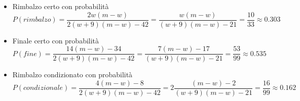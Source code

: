 \documentclass[a4paper,11pt]{article}
\begin{document}
\begin{itemize}
	\item 	
	Rimbalzo certo con probabilità
	 \[ P(rimbalzo)=\frac{2w(m-w)}{2(w+9)(m-w)-42}
	 =\frac{w(m-w)}{(w+9)(m-w)-21}
	 = \frac{10}{33}\approx0.303
	 \]

	\item 	
	Finale certo con probabilità 
	 \[ P(fine)=\frac{14(m-w)-34}{2(w+9)(m-w)-42}
	 =\frac{7(m-w)-17}{(w+9)(m-w)-21}
	 = \frac{53}{99}\approx0.535
	 \]
	 
	 \item 	
	 Rimbalzo condizionato con probabilità 
	 \[ P(condizionale)=\frac{4(m-w)-8}{2(w+9)(m-w)-42}
	 =2\frac{(m-w)-2}{(w+9)(m-w)-21}
	 = \frac{16}{99}\approx0.162
	 \]
\end{itemize}
\end{document}
